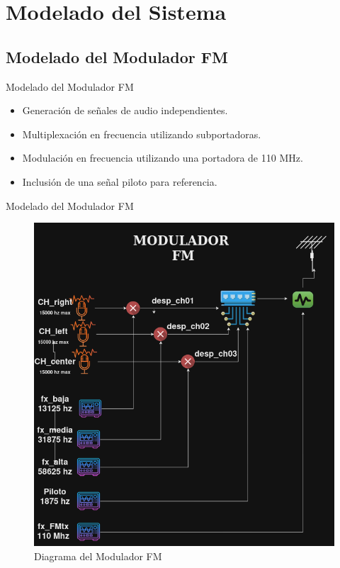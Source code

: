 \documentclass[mathserif,spanish]{beamer}
\begin{document}
\section{Modelado del Sistema}

\subsection{Modelado del Modulador FM}
\begin{frame}{Modelado del Modulador FM}
    \begin{itemize}
        \item Generación de señales de audio independientes.
        \item Multiplexación en frecuencia utilizando subportadoras.
        \item Modulación en frecuencia utilizando una portadora de 110 MHz.
        \item Inclusión de una señal piloto para referencia.
    \end{itemize}
    
\end{frame}

\begin{frame}{Modelado del Modulador FM}
   
    \begin{figure}[h]
        \centering
        \includegraphics[scale=0.3]{modu1.png}
        \caption{Diagrama del Modulador FM}
    \end{figure}
\end{frame}
\end{document}
